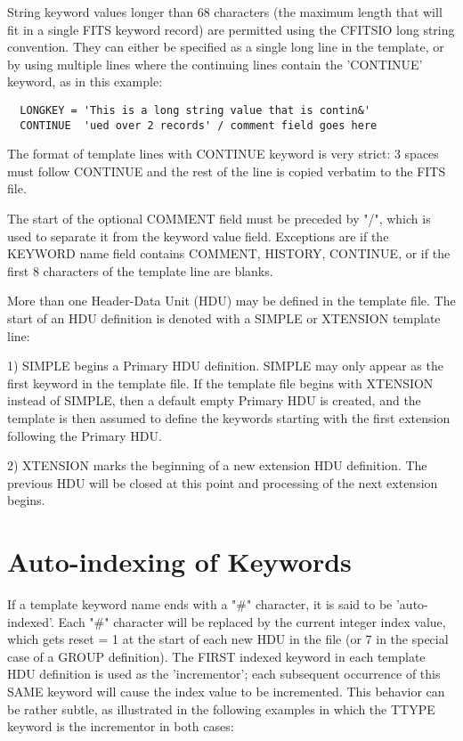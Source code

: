 \documentclass[11pt]{book}
\begin{document}
String keyword values longer than 68 characters (the maximum length
that will fit in a single FITS keyword record) are permitted using the
CFITSIO long string convention. They can either be specified as a
single long line in the template, or by using multiple lines where the
continuing lines contain the 'CONTINUE' keyword, as in this example:

\begin{verbatim}
  LONGKEY = 'This is a long string value that is contin&'
  CONTINUE  'ued over 2 records' / comment field goes here
\end{verbatim}
The format of template lines with CONTINUE keyword is very strict:  3
spaces must follow CONTINUE and the rest of the line is copied verbatim
to the FITS file.

The start of the optional COMMENT field must be preceded by "/", which
is used to separate it from the keyword value field. Exceptions are if
the KEYWORD name field contains COMMENT, HISTORY, CONTINUE, or if the
first 8 characters of the template line are blanks.

More than one Header-Data Unit (HDU) may be defined in the template
file.  The start of an HDU definition is denoted with a SIMPLE or
XTENSION template line:

1) SIMPLE begins a Primary HDU definition. SIMPLE may only appear as
the  first keyword in the template file. If the template file begins
with XTENSION instead of SIMPLE, then a default empty Primary HDU is
created, and the template is then assumed to define the keywords
starting with the first extension following the Primary HDU.

2) XTENSION marks the beginning of a new extension HDU definition.  The
previous HDU will be closed at this point and processing of the next
extension begins.


\section{Auto-indexing of Keywords}

If a template keyword name ends with a "\#" character, it is said to be
'auto-indexed'.   Each "\#" character will be replaced by the current
integer index value, which gets reset = 1 at the start of each new HDU
in the file (or 7 in the special case of a GROUP definition).  The
FIRST indexed keyword in each template HDU definition is used as the
'incrementor';  each subsequent occurrence of this SAME keyword will
cause the index value to be incremented.  This behavior can be rather
subtle, as illustrated in the following examples in which the TTYPE
keyword is the incrementor in both cases:
\end{document}
